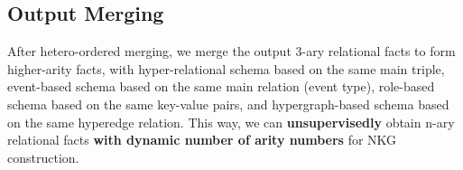 \documentclass{article} \usepackage{iclr2024_conference,times}
\begin{document}
\subsection{Output Merging}
After hetero-ordered merging, we merge the output 3-ary relational facts to form higher-arity facts, with hyper-relational schema based on the same main triple, event-based schema based on the same main relation (event type), role-based schema based on the same key-value pairs, and hypergraph-based schema based on the same hyperedge relation. This way, we can \textbf{unsupervisedly} obtain n-ary relational facts \textbf{with dynamic number of arity numbers} for NKG construction. 





\begin{table*}[t]
\centering
\scriptsize
{}
\caption{\label{t2}
Dataset statistics, where the columns indicate the number of entities, relations with four schema, sentences and n-ary relational facts in all sets, train set, dev set, and test set,respectively.
}
\end{table*}
\end{document}
